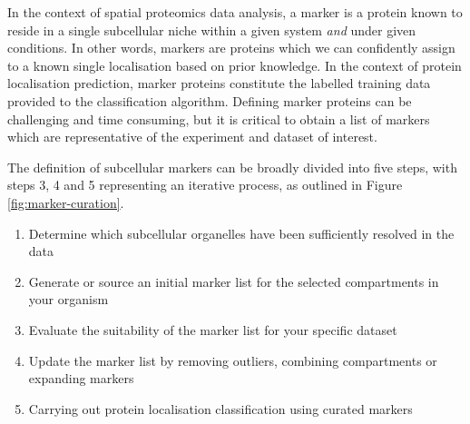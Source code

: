 \documentclass[9pt,a4paper,]{extarticle}
\begin{document}
In the context of spatial proteomics data analysis, a marker is a protein known
to reside in a single subcellular niche within a given system \emph{and} under given
conditions. In other words, markers are proteins which we can confidently assign
to a known single localisation based on prior knowledge. In the context of
protein localisation prediction, marker proteins constitute the labelled training data
provided to the classification algorithm. Defining marker proteins can be
challenging and time consuming, but it is critical to obtain a list of markers
which are representative of the experiment and dataset of interest.

The definition of subcellular markers can be broadly divided into five steps,
with steps 3, 4 and 5 representing an iterative process, as outlined in Figure \ref{fig:marker-curation}.

\begin{enumerate}
\def\labelenumi{\arabic{enumi}.}
\item
  Determine which subcellular organelles have been sufficiently resolved in the data
\item
  Generate or source an initial marker list for the selected compartments in your organism
\item
  Evaluate the suitability of the marker list for your specific dataset
\item
  Update the marker list by removing outliers, combining compartments or expanding markers
\item
  Carrying out protein localisation classification using curated markers
\end{enumerate}
\end{document}
